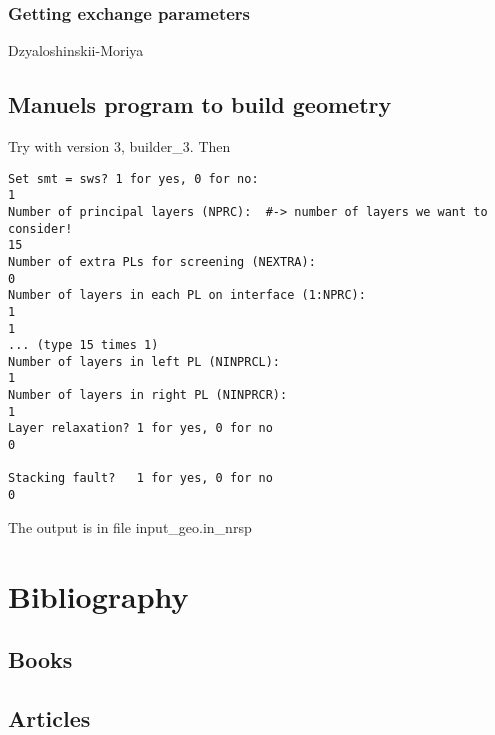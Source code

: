 \documentclass[11pt,fleqn]{book} %
\begin{document}
\subsection*{Getting exchange parameters}


Dzyaloshinskii-Moriya


\newpage

\section{Manuels program to build geometry}
\label{sec:geometry}



Try with version 3, builder\_3. Then
\begin{VBox}
\begin{verbatim}
Set smt = sws? 1 for yes, 0 for no:
1
Number of principal layers (NPRC):  #-> number of layers we want to consider!
15
Number of extra PLs for screening (NEXTRA):
0
Number of layers in each PL on interface (1:NPRC):
1
1
... (type 15 times 1)
Number of layers in left PL (NINPRCL):
1
Number of layers in right PL (NINPRCR):
1
Layer relaxation? 1 for yes, 0 for no
0

Stacking fault?   1 for yes, 0 for no
0
\end{verbatim}
\end{VBox}
The output is in file input\_geo.in\_nrsp


\chapter*{Bibliography}
\section*{Books}
\printbibliography[heading=bibempty,type=book]
\section*{Articles}
\printbibliography[heading=bibempty,type=article]


\cleardoublepage
{}
\setlength{\columnsep}{0.75cm}
\printindex

\end{document}
